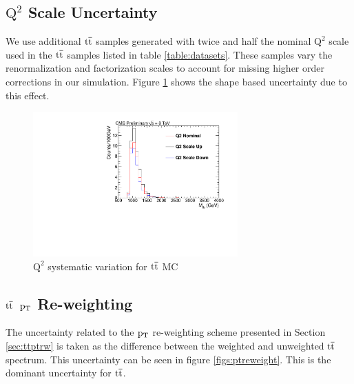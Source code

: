 
\subsection{$\mathrm{Q^2}$ Scale Uncertainty}
We use additional $\mathrm{t\overline{t}}$ samples generated with twice and half the nominal $\mathrm{Q^2}$ 
scale used in the $\mathrm{t\overline{t}}$ samples listed in table \ref{table:datasets}.  These samples vary the renormalization and factorization scales to account for 
missing higher order corrections in our simulation.  Figure \ref{figs:q2scale} shows the shape based uncertainty due to this effect.

\begin{figure}[htcb]
\begin{center}
\includegraphics[width=0.7\textwidth]{AN-13-004/figs/TTbar_Q2Scale}
\caption{
$\mathrm{Q^2}$ systematic variation for $\mathrm{t\overline{t}}$ MC 
}
\label{figs:q2scale}
\end{center}
\end{figure}

\subsection{$\mathrm{t\overline{t}}$ $\mathrm{p_{T}}$ Re-weighting}
The uncertainty related to the $\mathrm{p_{T}}$ re-weighting scheme presented in Section \ref{sec:ttptrw} is taken as the difference between the weighted and unweighted $\mathrm{t\overline{t}}$ spectrum.
This uncertainty can be seen in figure \ref{figs:ptreweight}.  This is the dominant uncertainty for $\mathrm{t\overline{t}}$. 

